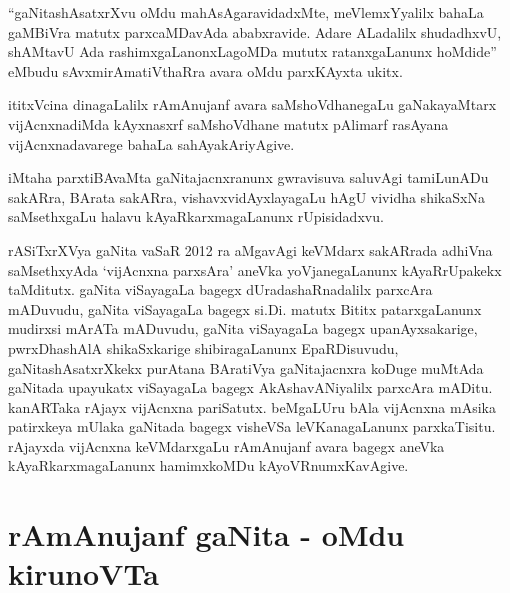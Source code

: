``gaNitashAsatxrXvu oMdu mahAsAgaravidadxMte, meVlemxYyalilx bahaLa gaMBiVra matutx parxcaMDavAda ababxravide. Adare ALadalilx  shudadhxvU, shAMtavU Ada rashimxgaLanonxLagoMDa mututx ratanxgaLanunx hoMdide'' eMbudu sAvxmirAmatiVthaRra avara oMdu parxKAyxta ukitx.
\vskip 0.1cm

ititxVcina dinagaLalilx rAmAnujanf avara saMshoVdhanegaLu gaNakayaMtarx vijAcnxna\-diMda kAyxnasxrf saMshoVdhane matutx pAlimarf rasAyana vijAcnxnadavarege bahaLa sahAya\-kAriyAgive.
\vskip 0.1cm

iMtaha parxtiBAvaMta gaNitajacnxranunx gwravisuva saluvAgi tamiLunADu sakARra, BArata sakARra, vishavxvidAyxlayagaLu hAgU vividha shikaSxNa saMsethxgaLu halavu kAyaRkarxmagaLanunx rUpisidadxvu.
\vskip 0.1cm

rASiTxrXVya gaNita vaSaR {\rm 2012} ra aMgavAgi keVMdarx sakARrada adhiVna saMsethxyAda `vijAcnxna parxsAra' aneVka yoVjanegaLanunx kAyaRrUpakekx taMditutx. gaNita viSayagaLa bagegx dUradashaRnadalilx parxcAra mADuvudu, gaNita viSayagaLa bagegx si.Di. matutx Bititx patarxgaLanunx mudirxsi mArATa mADuvudu, gaNita viSayagaLa bagegx upanAyxsakarige, pwrxDhashAlA shikaSxkarige shibiragaLanunx EpaRDisuvudu, gaNitashAsatxrXkekx purAtana BAratiVya gaNitajacnxra koDuge muMtAda gaNitada upayukatx viSayagaLa bagegx AkAshavANiyalilx parxcAra mADitu. kanARTaka rAjayx vijAcnxna pariSatutx. beMgaLUru bAla vijAcnxna mAsika patirxkeya mUlaka gaNitada bagegx visheVSa leVKanagaLanunx parxkaTisitu. rAjayxda vijAcnxna keVMdarxgaLu rAmAnujanf avara bagegx aneVka kAyaRkarxmagaLanunx hamimxkoMDu kAyoVRnumxKavAgive.

\section*{rAmAnujanf gaNita - oMdu kirunoVTa}

